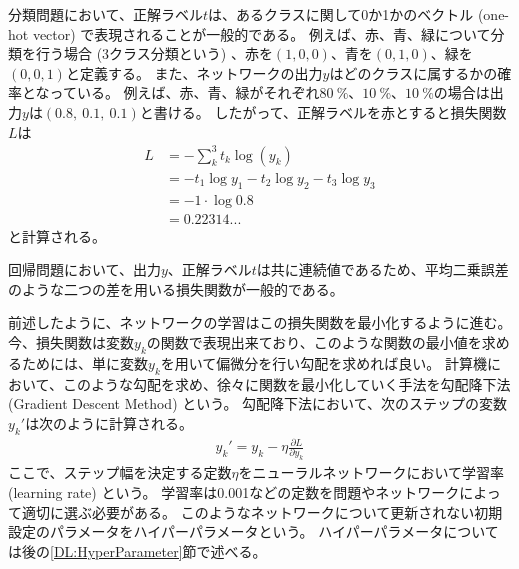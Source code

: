 分類問題において、正解ラベル$t$は、あるクラスに関して0か1かのベクトル (one-hot vector) で表現されることが一般的である。
例えば、赤、青、緑について分類を行う場合 (3クラス分類という) 、赤を$(1, 0, 0)$、青を$(0, 1, 0)$、緑を$(0, 0, 1)$と定義する。
また、ネットワークの出力$y$はどのクラスに属するかの確率となっている。
例えば、赤、青、緑がそれぞれ$80\ \%$、$10\ \%$、$10\ \%$の場合は出力$y$は$(0.8,\ 0.1,\ 0.1)$と書ける。
したがって、正解ラベルを赤とすると損失関数$L$は
\begin{equation}
 \begin{split}
  L &= - \sum^3_k t_k \log{(y_k)} \\
    &= - t_1 \log{y_1} - t_2 \log{y_2} - t_3 \log{y_3} \\
    &= - 1 \cdot \log{0.8}\\
    &= 0.22314...
 \end{split}
\end{equation}
と計算される。

回帰問題において、出力$y$、正解ラベル$t$は共に連続値であるため、平均二乗誤差のような二つの差を用いる損失関数が一般的である。

前述したように、ネットワークの学習はこの損失関数を最小化するように進む。
今、損失関数は変数$y_k$の関数で表現出来ており、このような関数の最小値を求めるためには、単に変数$y_k$を用いて偏微分を行い勾配を求めれば良い。
計算機において、このような勾配を求め、徐々に関数を最小化していく手法を勾配降下法 (Gradient Descent Method) という。
勾配降下法において、次のステップの変数$y_k'$は次のように計算される。
\begin{equation}
 \begin{split}
  y_k' = y_k - \eta \frac{\partial L}{\partial y_k}
 \end{split}
\end{equation}
ここで、ステップ幅を決定する定数$\eta$をニューラルネットワークにおいて学習率 (learning rate) という。
学習率は0.001などの定数を問題やネットワークによって適切に選ぶ必要がある。
このようなネットワークについて更新されない初期設定のパラメータをハイパーパラメータという。
ハイパーパラメータについては後の\ref{DL:HyperParameter}節で述べる。

